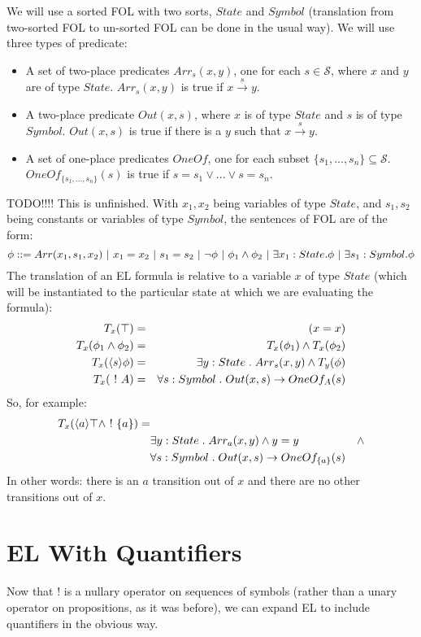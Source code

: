 We will use a sorted FOL with two sorts, $State$ and $Symbol$ (translation from two-sorted FOL to un-sorted FOL can be done in the usual way). 
We will use three types of predicate:
\begin{itemize}
\item
A set of two-place predicates $Arr_s(x, y)$, one for each $s \in \mathcal{S}$, where $x$ and $y$ are of type $State$. $Arr_s(x, y)$ is true if $x \xrightarrow{s} y$.
\item
A two-place predicate $Out(x, s)$, where $x$ is of type $State$ and $s$ is of type $Symbol$. $Out(x, s)$ is true if there is a $y$ such that $x \xrightarrow{s} y$.
\item 
A set of one-place predicates $OneOf$, one for each subset $\{s_1, ..., s_n\} \subseteq \mathcal{S}$. $OneOf_{\{s_1, ..., s_n\}}(s)$ is true if $s=s_1 \lor ... \lor s=s_n$.
\end{itemize}
TODO!!!! This is unfinished.
With $x_1, x_2$ being variables of type $State$, and $s_1, s_2$ being constants or variables of type $Symbol$, the sentences of FOL are of the form:
\[
\phi ::= Arr(x_1,s_1,x_2) \ | \  x_1 = x_2 \ | \  s_1 = s_2 \ | \  \neg \phi \ | \  \phi_1 \land \phi_2 \ | \  \exists x_1:State . \phi \ | \  \exists s_1:Symbol . \phi
\]
The translation of an EL formula is relative to a variable $x$ of type $State$ (which will be instantiated to the particular state at which we are evaluating the formula):
\begin{eqnarray}
T_x(\top) & = & (x = x) \nonumber \\
T_x(\phi_1 \land \phi_2) & = & T_x(\phi_1) \land T_x(\phi_2) \nonumber \\
T_x(\langle s \rangle \phi) & = & \exists y : State \; . \; Arr_s(x,y) \land T_y(\phi) \nonumber \\
T_x(\ ! \  A) & = & \forall s : Symbol \; . \; Out(x, s) \rightarrow  OneOf_A(s) \nonumber
\end{eqnarray}
So, for example:
\begin{eqnarray}
T_x(\langle a \rangle \top \land \ ! \  \{a\}) = & &\nonumber \\
& \exists y : State \; . \; Arr_a(x,y) \land y = y & \land \nonumber \\
& \forall s : Symbol \; . \; Out(x,s) \rightarrow OneOf_{\{a\}}(s) \nonumber
\end{eqnarray}
In other words: there is an $a$ transition out of $x$ and there are no other transitions out of $x$.

\section{EL With Quantifiers}
Now that $!$ is a nullary operator on sequences of symbols (rather than a unary operator on propositions, as it was before), we can expand EL to include quantifiers in the obvious way.

